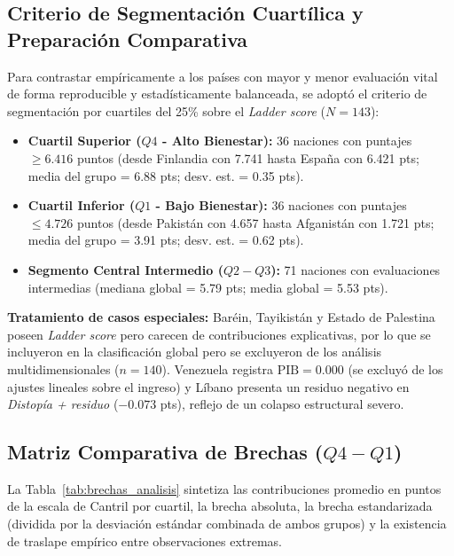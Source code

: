 \documentclass[11pt]{article}
\begin{document}
\subsection{Criterio de Segmentación Cuartílica y Preparación Comparativa}
Para contrastar empíricamente a los países con mayor y menor evaluación vital de forma reproducible y estadísticamente balanceada, se adoptó el criterio de segmentación por cuartiles del 25\% sobre el \textit{Ladder score} ($N = 143$):
\begin{itemize}
    \item \textbf{Cuartil Superior ($Q4$ - Alto Bienestar):} 36 naciones con puntajes $\ge 6.416$ puntos (desde Finlandia con 7.741 hasta España con 6.421 pts; media del grupo = 6.88 pts; desv. est. = 0.35 pts).
    \item \textbf{Cuartil Inferior ($Q1$ - Bajo Bienestar):} 36 naciones con puntajes $\le 4.726$ puntos (desde Pakistán con 4.657 hasta Afganistán con 1.721 pts; media del grupo = 3.91 pts; desv. est. = 0.62 pts).
    \item \textbf{Segmento Central Intermedio ($Q2-Q3$):} 71 naciones con evaluaciones intermedias (mediana global = 5.79 pts; media global = 5.53 pts).
\end{itemize}

\textbf{Tratamiento de casos especiales:} Baréin, Tayikistán y Estado de Palestina poseen \textit{Ladder score} pero carecen de contribuciones explicativas, por lo que se incluyeron en la clasificación global pero se excluyeron de los análisis multidimensionales ($n = 140$). Venezuela registra $\text{PIB} = 0.000$ (se excluyó de los ajustes lineales sobre el ingreso) y Líbano presenta un residuo negativo en \textit{Distopía + residuo} ($-0.073$ pts), reflejo de un colapso estructural severo.

\subsection{Matriz Comparativa de Brechas ($Q4 - Q1$)}
La Tabla~\ref{tab:brechas_analisis} sintetiza las contribuciones promedio en puntos de la escala de Cantril por cuartil, la brecha absoluta, la brecha estandarizada (dividida por la desviación estándar combinada de ambos grupos) y la existencia de traslape empírico entre observaciones extremas.
\end{document}
